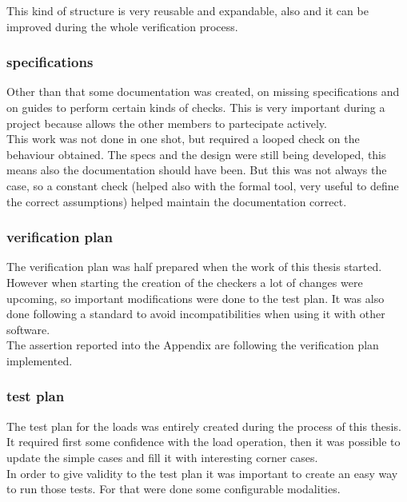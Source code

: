 This kind of structure is very reusable and expandable, also and it can be improved during the whole verification process.\\

\subsubsection{specifications}
Other than that some documentation was created, on missing specifications and on guides to perform certain kinds of checks. This is very important during a project because allows the other members to partecipate actively.\\

This work was not done in one shot, but required a looped check on the behaviour obtained. The specs and the design were still being developed, this means also the documentation should have been. But this was not always the case, so a constant check (helped also with the formal tool, very useful to define the correct assumptions) helped maintain the documentation correct.\\

\subsubsection{verification plan}
The verification plan was half prepared when the work of this thesis started. However when starting the creation of the checkers a lot of changes were upcoming, so important modifications were done to the test plan. It was also done following a standard to avoid incompatibilities when using it with other software.\\
The assertion reported into the Appendix are following the verification plan implemented.\\

\subsubsection{test plan}
The test plan for the loads was entirely created during the process of this thesis. It required first some confidence with the load operation, then it was possible to update the simple cases and fill it with interesting corner cases.\\

In order to give validity to the test plan it was important to create an easy way to run those tests. For that were done some configurable modalities.\\


